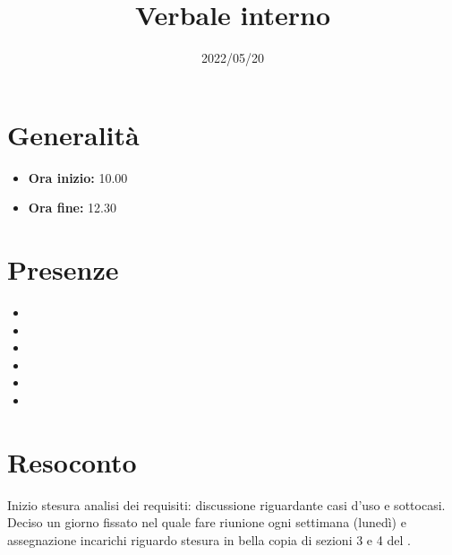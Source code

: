 \documentclass{classes/base}
\title{Verbale interno}
\date{2022/05/20}
\author{\marcob}
\renewcommand{\maketitle}{
    
}
\begin{document}
    \maketitle

    \section*{Generalità}
    \begin{itemize}
        \item \textbf{Ora inizio:} 10.00
        \item \textbf{Ora fine:} 12.30
    \end{itemize}

    \section*{Presenze}
    \begin{itemize}
     	\item \angela
        \item \marcob
        \item \tommaso
        \item \ruth
        \item \marcov
        \item \giulio
    \end{itemize}

    \section*{Resoconto}
    Inizio stesura analisi dei requisiti: discussione riguardante casi d'uso e sottocasi.\\
    Deciso un giorno fissato nel quale fare riunione ogni settimana (lunedì) e assegnazione incarichi riguardo
    stesura in bella copia di sezioni 3 e 4 del \PdP.
\end{document}
